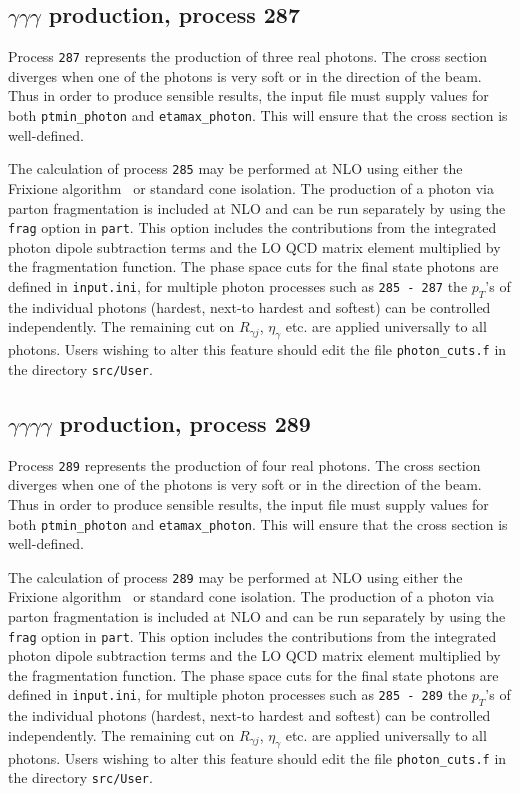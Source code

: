 \subsection{$\gamma\gamma\gamma$ production, process 287}
\label{subsec:trigam}

Process {\tt 287} represents the production of three real photons.
The cross section diverges
when one of the photons is very soft or in the direction of the beam.
Thus in order to produce sensible results, the input file must supply values for both
{\tt ptmin\_photon} and {\tt etamax\_photon}. This will ensure that
the cross section is well-defined.

The calculation of process {\tt 285} may be performed at NLO using either the
Frixione algorithm~\cite{Frixione:1998jh} or standard cone isolation.  The production of a photon via parton 
fragmentation is included at NLO and 
can be run separately by using the {\tt frag} option in {\tt part}. This option includes the contributions from the 
integrated 
photon dipole subtraction terms and the LO QCD matrix element multiplied by the fragmentation function.  
The phase space cuts for the final state photons are defined in {\tt{input.ini}}, for multiple photon processes such 
as {\tt 285 - 287} the $p_T$'s of the individual photons (hardest, next-to hardest and softest) can be controlled 
independently. 
The remaining cut on $R_{\gamma j}$, $\eta_{\gamma}$ etc. are applied universally to all photons. Users wishing to alter
this feature should edit the file {\tt{photon\_cuts.f}} in the directory {\tt{src/User}}. 


\subsection{$\gamma\gamma\gamma\gamma$ production, process 289}
\label{subsec:fourgam}

Process {\tt 289} represents the production of four real photons.
The cross section diverges
when one of the photons is very soft or in the direction of the beam.
Thus in order to produce sensible results, the input file must supply values for both
{\tt ptmin\_photon} and {\tt etamax\_photon}. This will ensure that
the cross section is well-defined.

The calculation of process {\tt 289} may be performed at NLO using either the
Frixione algorithm~\cite{Frixione:1998jh} or standard cone isolation.  The production of a photon via parton 
fragmentation is included at NLO and
can be run separately by using the {\tt frag} option in {\tt part}. This option includes the contributions from the 
integrated
photon dipole subtraction terms and the LO QCD matrix element multiplied by the fragmentation function.
The phase space cuts for the final state photons are defined in {\tt{input.ini}}, for multiple photon processes such
as {\tt 285 - 289} the $p_T$'s of the individual photons (hardest, next-to hardest and softest) can be controlled 
independently.
The remaining cut on $R_{\gamma j}$, $\eta_{\gamma}$ etc. are applied universally to all photons. Users wishing to alter
this feature should edit the file {\tt{photon\_cuts.f}} in the directory {\tt{src/User}}.

